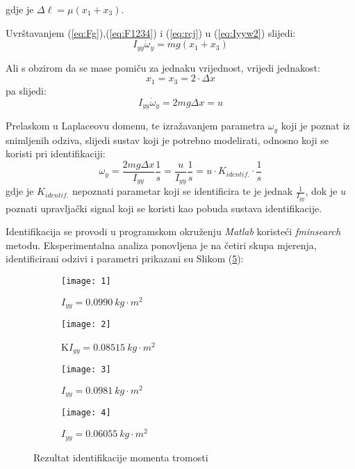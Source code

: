 \documentclass[11pt,a4paper]{article}
\begin{document}
gdje je $\Delta \ell = \mu(x_{1}  + x_{3})$.

Uvrštavanjem (\ref{eq:Fg}),(\ref{eq:F1234}) i (\ref{eq:rcj}) u (\ref{eq:Iyyw2}) slijedi:
\begin{equation}
 I_{yy}\dot{\omega}_{y} = mg(x_{1} + x_{3})
 \label{eq:Iyyw3}
 \end{equation} 
 
 Ali s obzirom da se mase pomiču za jednaku vrijednost, vrijedi jednakost:
 \begin{equation}
 x_{1} = x_{3} = 2\cdot\Delta x
 \label{eq:x1xx3}
 \end{equation}
pa slijedi:
\begin{equation}
I_{yy} \dot{\omega}_{y} = 2mg\Delta x = u
\label{eq:upr}
\end{equation}

Prelaskom u Laplaceovu domenu, te izražavanjem parametra $\omega_{y}$ koji je poznat iz snimljenih odziva, slijedi sustav koji je potrebno modelirati, odnosno koji se koristi pri identifikaciji:
\begin{equation}
\omega_{y} = \frac{2mg \Delta x}{I_{yy}} \frac{1}{s} = \frac{u}{I_{yy}} \frac{1}{s} = u \cdot K_{identif.} \cdot \frac{1}{s}
\label{eq:wy}
\end{equation}
\medskip
gdje je $K_{identif.}$ nepoznati parametar koji se identificira te je jednak $\frac{1}{I_{yy}}$, dok je $u$ poznati upravljački signal koji se koristi kao pobuda sustava identifikacije.

Identifikacija se provodi u programskom okruženju \textit{Matlab} koristeći \textit{fminsearch} metodu. Eksperimentalna analiza ponovljena je na četiri skupa mjerenja, identificirani odzivi i parametri prikazani su Slikom (\ref{fig:Iyy}):   
    



\begin{figure}[H]
	\centering
	\begin{subfigure}{.5\textwidth}
		\centering
		\texttt{[image: 1]}
		\caption{$I_{yy} = 0.0990 \ kg \cdot m^{2}$}
		\label{fig:mj1}
	\end{subfigure}%
	\begin{subfigure}{.5\textwidth}
		\centering
		\texttt{[image: 2]}
		\caption{K$I_{yy} = 0.08515 \ kg \cdot m^{2}$}
		\label{fig:mj2}
	\end{subfigure}
	\begin{subfigure}{.5\textwidth}
		\centering
		\texttt{[image: 3]}
		\caption{$I_{yy} = 0.0981 \ kg \cdot m^{2}$}
		\label{fig:mj3}
	\end{subfigure}%
	\begin{subfigure}{.5\textwidth}
		\centering
		\texttt{[image: 4]}
		\caption{$I_{yy} = 0.06055 \ kg \cdot m^{2}$}
		\label{fig:mj4}
	\end{subfigure}
	
	\caption{Rezultat identifikacije momenta tromosti}
	\label{fig:Iyy}
\end{figure} 
\end{document}
